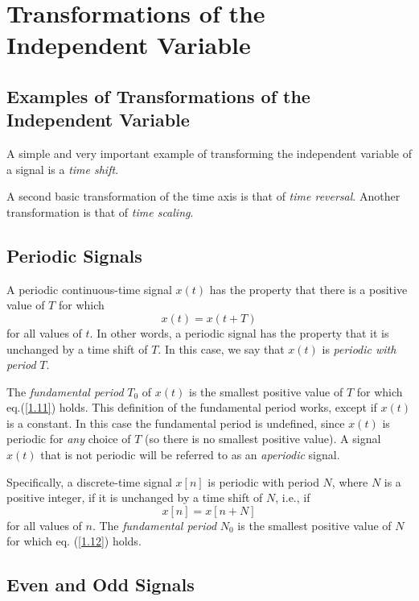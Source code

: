 \documentclass[a4paper,twoside]{book}
\begin{document}
\section{Transformations of the Independent Variable}
\subsection{Examples of Transformations of the Independent Variable}

A simple and very important example of transforming the independent variable of a signal is a \textit{time shift}.

A second basic transformation of the time axis is that of \textit{time reversal}. Another transformation is that of \textit{time scaling}.

\subsection{Periodic Signals}

A periodic continuous-time signal $x(t)$ has the property that there is a positive value of $T$ for which
\begin{equation}
    x(t)=x(t+T)
    \label{1.11}
\end{equation}
for all values of $t$. In other words, a periodic signal has the property that it is unchanged by a time shift of $T$. In this case, we say that $x(t)$ is \textit{periodic with period} $T$.

The \textit{fundamental period} $T_0$ of $x(t)$ is the smallest positive value of $T$ for which eq.\;(\ref{1.11}) holds. This definition of the fundamental period works, except if $x(t)$ is a constant. In this case the fundamental period is undefined, since $x(t)$ is periodic for \textit{any} choice of $T$ (so there is no smallest positive value). A signal $x(t)$ that is not periodic will be referred to as an \textit{aperiodic} signal.

Specifically, a discrete-time signal $x[n]$ is periodic with period $N$, where $N$ is a positive integer, if it is unchanged by a time shift of $N$, i.e., if
\begin{equation}
    x[n]=x[n+N]
    \label{1.12}
\end{equation}
for all values of $n$. The \textit{fundamental period} $N_0$ is the smallest positive value of $N$ for which eq. (\ref{1.12}) holds.

\subsection{Even and Odd Signals}
\end{document}
